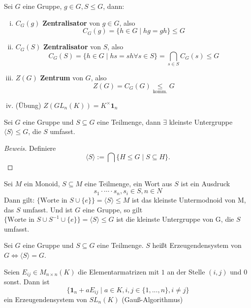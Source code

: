 \documentclass[a4paper]{report}
\begin{document}
\begin{bsp*}
  Sei $G$ eine Gruppe, $g  \in G, S \le G$, dann:
  \begin{enumerate}[(i)] %
\item $C_{G}(g)$ \textbf{Zentralisator} von $g \in G$, also $$C_{G}(g) = \{h \in G \mid hg = gh\} \le G$$
\item $C_{G}(S)$ \textbf{Zentralisator} von $S$, also $$C_{G}(S) = \{h \in G \mid hs = sh \forall s \in S\} = \bigcap_{s \in S} C_{G}(s) \le G$$
\item $Z(G)$ \textbf{Zentrum} von $G$, also $$Z(G)=C_{G}(G) \underset{\text{komm.}}\le G$$
\item (Übung) $Z(GL_{n}(K)) = K^{\times}\mathbf{1}_{n}$
  \end{enumerate}

\end{bsp*}

\begin{lemm}
  Sei $G$ eine Gruppe und $S \subseteq G$ eine Teilmenge, dann $\exists$ kleinste Untergruppe $\langle S \rangle \le G$, die $S$ umfasst.
  \begin{proof}[Beweis]
    Definiere $$\langle S \rangle := \bigcap \{H \leq G \mid S \subseteq H\}.$$
  \end{proof}

\end{lemm}

\begin{ubng}
Sei $M$ ein Monoid, $S \subseteq M$ eine Teilmenge, ein Wort aus $S$ ist ein Ausdruck $$s_{1} \cdot \cdots \cdot s_{n}, s_{i} \in S, n\in N$$
Dann gilt: $\{\text{Worte in } S \cup \{e\}\} = \langle S \rangle \le M$ ist das kleinste Untermodnoid von M, das $S$ umfasst.
Und ist $G$ eine Gruppe, so gilt $\{\text{Worte in } S \cup S^{-1} \cup \{e\}\} = \langle S \rangle \le G$ ist die kleinste Untergruppe von G, die $S$ umfasst.
\end{ubng}

\begin{defi}
Sei $G$ eine Gruppe und $S \subseteq G$ eine Teilmenge. $S$ heißt Erzeugendensystem von $G \iff \langle S \rangle = G$.
\end{defi}

\begin{bsp*}[Übung]
Seien $E_{ij} \in M_{n \times n}(K)$ die Elementarmatrizen mit $1$ an der Stelle $(i,j)$ und $0$ sonst. Dann ist
$$\{\mathbf 1_{n} + aE_{ij} \mid a \in K, i,j \in \{1, ..., n\}, i \neq j\}$$
ein Erzeugendensystem von $SL_{n}(K)$ (Gauß-Algorithmus)
\end{bsp*}
\end{document}
